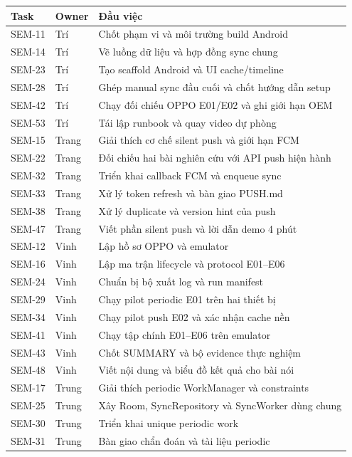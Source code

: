 \small
\begin{longtable}{@{}p{1.7cm}p{1.55cm}p{11.65cm}@{}}
\toprule
Task & Owner & Đầu việc \\
\midrule
\endhead
\bottomrule
\endlastfoot
SEM-11 & Trí & Chốt phạm vi và môi trường build Android \\
SEM-14 & Trí & Vẽ luồng dữ liệu và hợp đồng sync chung \\
SEM-23 & Trí & Tạo scaffold Android và UI cache/timeline \\
SEM-28 & Trí & Ghép manual sync đầu cuối và chốt hướng dẫn setup \\
SEM-42 & Trí & Chạy đối chiếu OPPO E01/E02 và ghi giới hạn OEM \\
SEM-53 & Trí & Tái lập runbook và quay video dự phòng \\
SEM-15 & Trang & Giải thích cơ chế silent push và giới hạn FCM \\
SEM-22 & Trang & Đối chiếu hai bài nghiên cứu với API push hiện hành \\
SEM-32 & Trang & Triển khai callback FCM và enqueue sync \\
SEM-33 & Trang & Xử lý token refresh và bàn giao PUSH.md \\
SEM-38 & Trang & Xử lý duplicate và version hint của push \\
SEM-47 & Trang & Viết phần silent push và lời dẫn demo 4 phút \\
SEM-12 & Vinh & Lập hồ sơ OPPO và emulator \\
SEM-16 & Vinh & Lập ma trận lifecycle và protocol E01–E06 \\
SEM-24 & Vinh & Chuẩn bị bộ xuất log và run manifest \\
SEM-29 & Vinh & Chạy pilot periodic E01 trên hai thiết bị \\
SEM-34 & Vinh & Chạy pilot push E02 và xác nhận cache nền \\
SEM-41 & Vinh & Chạy tập chính E01–E06 trên emulator \\
SEM-43 & Vinh & Chốt SUMMARY và bộ evidence thực nghiệm \\
SEM-48 & Vinh & Viết nội dung và biểu đồ kết quả cho bài nói \\
SEM-17 & Trung & Giải thích periodic WorkManager và constraints \\
SEM-25 & Trung & Xây Room, SyncRepository và SyncWorker dùng chung \\
SEM-30 & Trung & Triển khai unique periodic work \\
SEM-31 & Trung & Bàn giao chẩn đoán và tài liệu periodic \\

\end{longtable}
